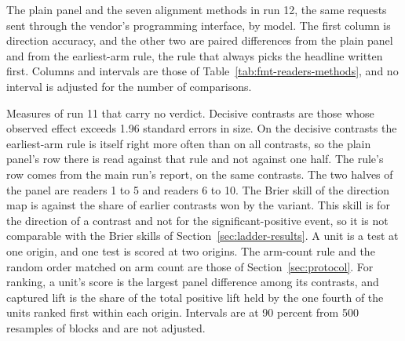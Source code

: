 \begin{table}[t]\centering\footnotesize
\caption{The plain panel and the seven alignment methods in run 12, the same requests sent through the vendor's programming interface, by model. The first column is direction accuracy, and the other two are paired differences from the plain panel and from the earliest-arm rule, the rule that always picks the headline written first. Columns and intervals are those of Table~\ref{tab:fmt-readers-methods}, and no interval is adjusted for the number of comparisons.}
\label{tab:fmt-readers-methods-api}

\end{table}

\begin{table}[t]\centering\footnotesize
\caption{Measures of run 11 that carry no verdict. Decisive contrasts are those whose observed effect exceeds 1.96 standard errors in size. On the decisive contrasts the earliest-arm rule is itself right more often than on all contrasts, so the plain panel's row there is read against that rule and not against one half. The rule's row comes from the main run's report, on the same contrasts. The two halves of the panel are readers 1 to 5 and readers 6 to 10. The Brier skill of the direction map is against the share of earlier contrasts won by the variant. This skill is for the direction of a contrast and not for the significant-positive event, so it is not comparable with the Brier skills of Section~\ref{sec:ladder-results}. A unit is a test at one origin, and one test is scored at two origins. The arm-count rule and the random order matched on arm count are those of Section~\ref{sec:protocol}. For ranking, a unit's score is the largest panel difference among its contrasts, and captured lift is the share of the total positive lift held by the one fourth of the units ranked first within each origin. Intervals are at 90 percent from 500 resamples of blocks and are not adjusted.}
\label{tab:fmt-readers-more}

\end{table}

